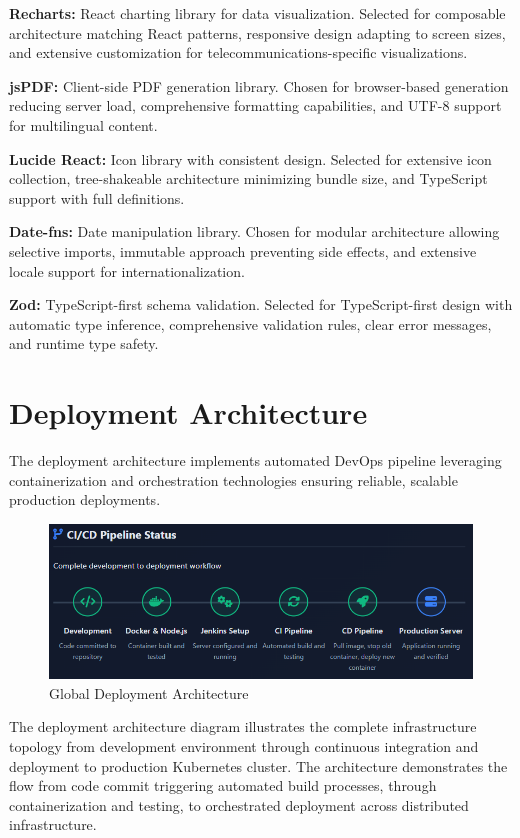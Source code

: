 \textbf{Recharts:} React charting library for data visualization. Selected for composable architecture matching React patterns, responsive design adapting to screen sizes, and extensive customization for telecommunications-specific visualizations.

\textbf{jsPDF:} Client-side PDF generation library. Chosen for browser-based generation reducing server load, comprehensive formatting capabilities, and UTF-8 support for multilingual content.

\textbf{Lucide React:} Icon library with consistent design. Selected for extensive icon collection, tree-shakeable architecture minimizing bundle size, and TypeScript support with full definitions.

\textbf{Date-fns:} Date manipulation library. Chosen for modular architecture allowing selective imports, immutable approach preventing side effects, and extensive locale support for internationalization.

\textbf{Zod:} TypeScript-first schema validation. Selected for TypeScript-first design with automatic type inference, comprehensive validation rules, clear error messages, and runtime type safety.

\section{Deployment Architecture}

The deployment architecture implements automated DevOps pipeline leveraging containerization and orchestration technologies ensuring reliable, scalable production deployments.

\begin{figure}[H]
    \centering
    \includegraphics[width=0.9\linewidth]{img/chap_02/deployment_architecture.png}
    \caption{Global Deployment Architecture}
    \label{fig:deployment_architecture}
\end{figure}

The deployment architecture diagram illustrates the complete infrastructure topology from development environment through continuous integration and deployment to production Kubernetes cluster. The architecture demonstrates the flow from code commit triggering automated build processes, through containerization and testing, to orchestrated deployment across distributed infrastructure.

